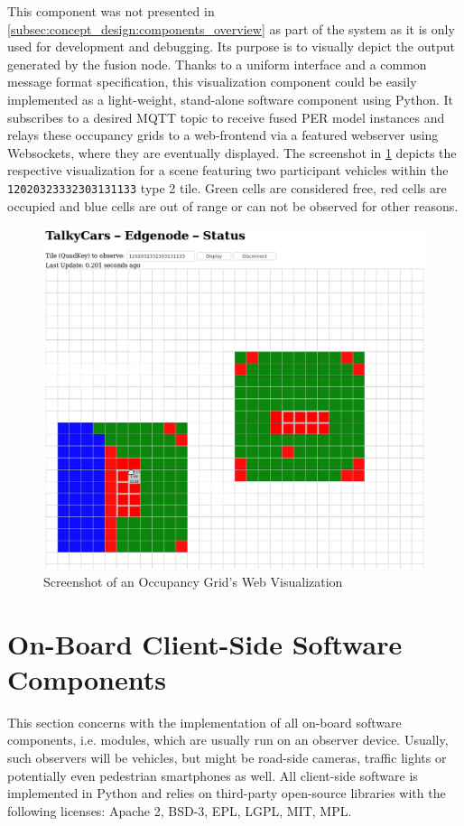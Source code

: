 This component was not presented in \cref{subsec:concept_design:components_overview} as part of the system as it is only used for development and debugging. Its purpose is to visually depict the output generated by the fusion node. Thanks to a uniform interface and a common message format specification, this visualization component could be easily implemented as a light-weight, stand-alone software component using Python. It subscribes to a desired MQTT topic to receive fused PER model instances and relays these occupancy grids to a web-frontend via a featured webserver using Websockets, where they are eventually displayed. The screenshot in \cref{fig:screenshot_web_node} depicts the respective visualization for a scene featuring two participant vehicles within the \texttt{12020323332303131133} type 2 tile. Green cells are considered free, red cells are occupied and blue cells are out of range or can not be observed for other reasons.

\begin{figure}[h]
	\centering
	\includegraphics[width=0.8\linewidth]{98_images/screenshot_web_node}
	\caption{Screenshot of an Occupancy Grid's Web Visualization}
	\label{fig:screenshot_web_node}
\end{figure}

\section{On-Board Client-Side Software Components}
\label{sec:implementation:on_board_client_side_software_components}
This section concerns with the implementation of all on-board software components, i.e. modules, which are usually run on an observer device. Usually, such observers will be vehicles, but might be road-side cameras, traffic lights or potentially even pedestrian smartphones as well. All client-side software is implemented in Python and relies on third-party open-source libraries with the following licenses: Apache 2, BSD-3, EPL, LGPL, MIT, MPL. 

